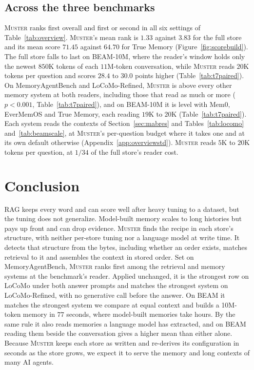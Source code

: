 \documentclass{article}
\newcommand{\sys}{\textsc{Muster}}
\begin{document}
\subsection{Across the three benchmarks}\label{sec:across}

\sys{} ranks first overall and first or second in all six settings of Table~\ref{tab:overview}. \sys{}'s mean rank is $1.33$ against $3.83$ for the full store and its mean score $71.45$ against $64.70$ for True Memory (Figure~\ref{fig:scorebuild}). The full store falls to last on BEAM-10M, where the reader's window holds only the newest $850$K tokens of each $11$M-token conversation, while \sys{} reads $20$K tokens per question and scores $28.4$ to $30.0$ points higher (Table~\ref{tab:t7paired}). On MemoryAgentBench and LoCoMo-Refined, \sys{} is above every other memory system at both readers, including those that read as much or more ($p<0.001$, Table~\ref{tab:t7paired}), and on BEAM-10M it is level with Mem0, EverMemOS and True Memory, each reading $19$K to $20$K (Table~\ref{tab:t7paired}). Each system reads the contexts of Section~\ref{sec:mabres} and Tables~\ref{tab:locomo} and~\ref{tab:beamscale}, at \sys{}'s per-question budget where it takes one and at its own default otherwise (Appendix~\ref{app:overviewstd}). \sys{} reads $5$K to $20$K tokens per question, at $1/34$ of the full store's reader cost.

\FloatBarrier
\section{Conclusion}

RAG keeps every word and can score well after heavy tuning to a dataset, but the tuning does not generalize. Model-built memory scales to long histories but pays up front and can drop evidence. \sys{} finds the recipe in each store's structure, with neither per-store tuning nor a language model at write time. It detects that structure from the bytes, including whether an order exists, matches retrieval to it and assembles the context in stored order. Set on MemoryAgentBench, \sys{} ranks first among the retrieval and memory systems at the benchmark's reader. Applied unchanged, it is the strongest row on LoCoMo under both answer prompts and matches the strongest system on LoCoMo-Refined, with no generative call before the answer. On BEAM it matches the strongest system we compare at equal context and builds a 10M-token memory in $77$ seconds, where model-built memories take hours. By the same rule it also reads memories a language model has extracted, and on BEAM reading them beside the conversation gives a higher mean than either alone. Because \sys{} keeps each store as written and re-derives its configuration in seconds as the store grows, we expect it to serve the memory and long contexts of many AI agents.
\end{document}
